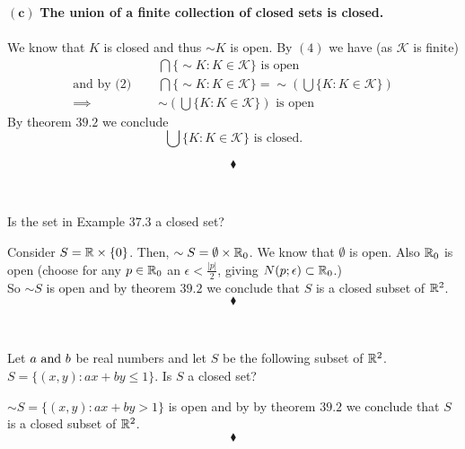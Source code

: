 $\mathbf{(c)}$ \textbf{The union of a finite collection of closed sets is closed.}\\\\
We know that $K$ is closed and thus $\sim K$ is open. By $(4)$ we have (as $\mathscr{K}$ is finite)
\begin{align*}
& \bigcap\{\sim K:K\in\mathscr{K}\} \text{ is open}\\
\text{and by (2) }\quad  & \bigcap\{\sim K:K\in\mathscr{K}\} = \sim \left(\bigcup\{ K:K\in\mathscr{K}\}\right)\\
\implies\quad &   \sim\left(\bigcup\{ K:K\in\mathscr{K}\}\right) \text{ is open}
\end{align*}
By theorem $\mathbf{39.2}$ we conclude 
$$\bigcup\{ K:K\in\mathscr{K}\} \text{ is closed.}$$


$$\blacklozenge$$\\


\subsection{}
\begin{tcolorbox}
Is the set in Example $\mathbf{37.3 }$ a closed set?
\end{tcolorbox}
Consider $S=\mathbb{R}\times\{0\}$. Then, $\sim S=\emptyset\times \mathbb{R}_{0}$. We know that $\emptyset$ is open. Also $\mathbb{R}_{0}$ is open (choose for any $p\in \mathbb{R}_{0}$ an $\epsilon<\frac{|p|}{2}$, giving $N(p;\epsilon)\subset \mathbb{R}_{0}$.)\\
So $\sim S$ is open and by theorem $\mathbf{39.2}$ we conclude that $S$ is a closed subset of $\mathbb{R}^2$.
$$\blacklozenge$$\\


\subsection{}
\begin{tcolorbox}
Let $a \text{ and } b$ be real numbers and let $S$ be the following subset of $\mathbb{R}^2$. $ S = \{(x,y):ax + by \leq 1\}$. Is $S$ a closed set?
\end{tcolorbox}
$ \sim S = \{(x,y):ax + by > 1\}$ is open and by by theorem $\mathbf{39.2}$ we conclude that $S$ is a closed subset of $\mathbb{R}^2$.
$$\blacklozenge$$\\

